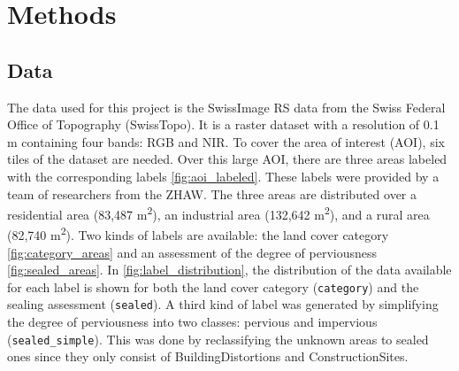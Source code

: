 

\section{Methods}
\label{methods}

\subsection{Data}%

The data used for this project is the SwissImage RS \autocite{swisstopoSWISSIMAGERS2024}
data from the Swiss Federal Office of Topography (SwissTopo).
It is a raster dataset with a resolution of 0.1 m containing four bands: RGB and NIR.
To cover the area of interest (AOI), six tiles of the dataset are needed.
Over this large AOI, there are three areas labeled with the corresponding labels \autoref{fig:aoi_labeled}.
These labels were provided by a team of researchers from the ZHAW. The three
areas are distributed over a residential area (83,487 m\textsuperscript{2}),
an industrial area (132,642 m\textsuperscript{2}), and a rural area (82,740 m\textsuperscript{2}).
Two kinds of labels are available: the land cover category \autoref{fig:category_areas} and an assessment of the 
degree of perviousness \autoref{fig:sealed_areas}. In \autoref{fig:label_distribution}, the distribution of
the data available for each label is shown for both the land cover category (\texttt{category}) and the sealing assessment (\texttt{sealed}).
A third kind of label was generated by simplifying the degree of perviousness into two classes: pervious and impervious (\texttt{sealed\_simple}).
This was done by reclassifying the unknown areas to sealed ones since they only consist of BuildingDistortions and
ConstructionSites.

